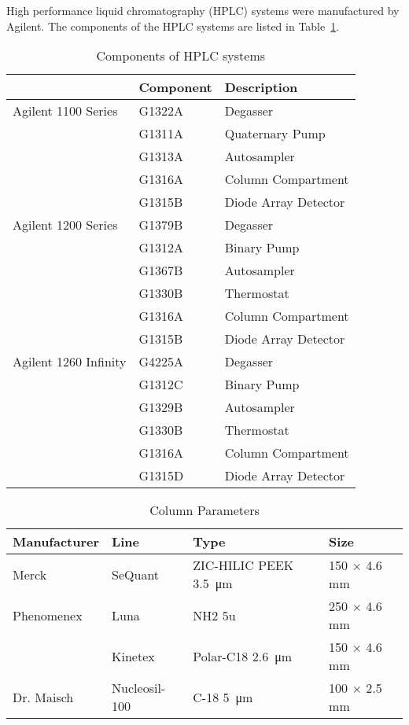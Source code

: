 	High performance liquid chromatography (HPLC) systems were manufactured by Agilent. The components of the HPLC systems are listed in Table~\ref{tab:HPLCtab}.

	\begin{table}[htbp]
		\caption{Components of HPLC systems}
		\label{tab:HPLCtab}
		\centering
		\begin{tabularx}{\textwidth}{XXX}
			\toprule
							& \textbf{Component}		& \textbf{Description}	\\
			\midrule
			Agilent 1100 Series		&	G1322A		&	Degasser			\\
									&	G1311A		&	Quaternary Pump		\\
									&	G1313A		&	Autosampler			\\
									&	G1316A		&	Column Compartment	\\
									&	G1315B		&	Diode Array Detector	\\
			\midrule
			Agilent 1200 Series		&	G1379B		&	Degasser			\\
									&	G1312A		&	Binary Pump			\\
									&	G1367B		&	Autosampler			\\
									&	G1330B		&	Thermostat			\\
									&	G1316A		&	Column Compartment	\\
									&	G1315B		&	Diode Array Detector	\\
			\midrule
			Agilent 1260 Infinity	&	G4225A		&	Degasser			\\
									&	G1312C		&	Binary Pump			\\
									&	G1329B		&	Autosampler			\\
									&	G1330B		&	Thermostat			\\
									&	G1316A		&	Column Compartment	\\
									&	G1315D		&	Diode Array Detector	\\
			\bottomrule
		\end{tabularx}
	\end{table}

	\begin{table}[htbp]
		\caption{Column Parameters}
		\label{tab:column_parameters}
		\centering
			\begin{tabularx}{\textwidth}{XXXX}
			\toprule
			\textbf{Manufacturer} 	& \textbf{Line} 						& \textbf{Type} 					& \textbf{Size} 	\\
			\midrule
			Merck 					& SeQuant\textsuperscript{\textregistered} 		& \mbox{ZIC\textsuperscript{\textregistered}-HILIC} PEEK \SI{3.5}{\micro\meter}					& 150 $\times$ 4.6 mm 	\\
			Phenomenex 				& Luna\textsuperscript{\textregistered} 			& NH2 5u		& 250 $\times$ 4.6 mm 	\\
									& Kinetex\textsuperscript{\textregistered} 		& Polar-C18	\SI{2.6}{\micro\meter}						& 150 $\times$ 4.6 mm 	\\
			Dr. Maisch 				& Nucleosil-100 & C-18 \SI{5}{\micro\meter} 							& 100 $\times$ 2.5 mm 	\\
			\bottomrule
			\end{tabularx}
		\end{table}
\clearpage

